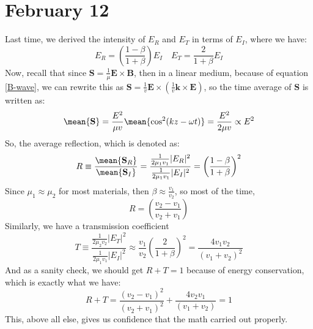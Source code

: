 \section{February 12}
Last time, we derived the intensity of \( E_R \) and \( E_T \) in terms of \( E_I \), where we have:
\[
	E_R = \left( \frac{1 - \beta}{ 1 + \beta} \right)E_I \quad E_T = \frac{2}{1 + \beta}E_I
\]
Now, recall that since \( \mathbf{S} = \frac{1}{\mu}\mathbf{E} \times \mathbf{B} \), then in a linear medium,
because of equation \ref{B-wave}, we can rewrite this as \( \mathbf{S} = \frac{1}{v}\mathbf{E} \times
(\frac{1}{v} \mathbf{k}\times \mathbf{E}) \), so the time average of \( \mathbf{S} \) is written as:
\[
	\mean{\mathbf{S}} = \frac{E^2}{\mu v} \mean{\cos^2(kz - \omega t)} = \frac{E^2}{2 \mu v} \propto E^2
\]
So, the average reflection, which is denoted as:
\[
	R \equiv \frac{\mean{\mathbf{S}_R}}{\mean{\mathbf{S}_I}} = \frac{\frac{1}{2 \mu_1 v_1}
	|E_R|^2}{\frac{1}{2\mu_1v_1}|E_I|^2} = \left( \frac{1 - \beta}{1 + \beta} \right)^2
\]
Since \( \mu_1 \approx \mu_2 \) for most materials, then \( \beta \approx \frac{v_1}{v_2} \), so most of the
time, 
\[
	R = \left(\frac{v_2 - v_1}{v_2 + v_1}\right)
\]
Similarly, we have a transmission coefficient
\[
	T \equiv \frac{\frac{1}{2\mu_2v_2}|E_T|^2}{\frac{1}{2\mu_1v_1}|E_I|^2} \approx \frac{v_1}{v_2}\left(
	\frac{2}{1 + \beta} \right)^2 = \frac{4v_1v_2}{(v_1 + v_2)^2}
\]
And as a sanity check, we should get \( R + T = 1 \) because of energy conservation, which is exactly what
we have:
\[
	R + T = \frac{(v_2 - v_1)^2}{(v_2 + v_1)^2} + \frac{4v_2v_1}{(v_1 + v_2)} = 1
\]
This, above all else, gives us confidence that the math carried out properly.  


